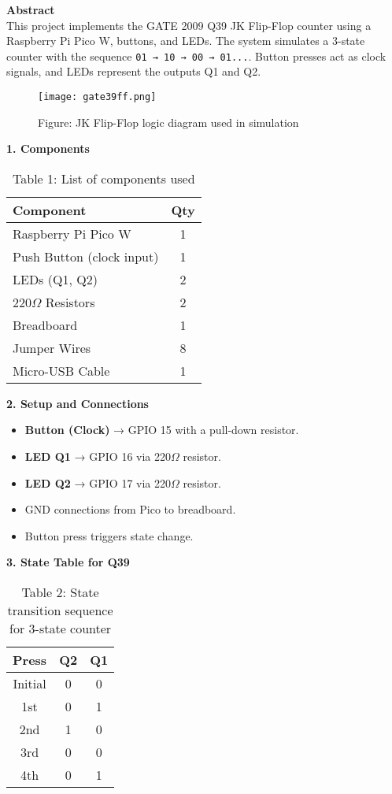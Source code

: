 \documentclass[12pt]{article}
\begin{document}
\begin{multicols}{2}

\noindent\textbf{Abstract} \\[0.5em]
This project implements the GATE 2009 Q39 JK Flip-Flop counter using a Raspberry Pi Pico W, buttons, and LEDs. The system simulates a 3-state counter with the sequence \texttt{01 → 10 → 00 → 01...}. Button presses act as clock signals, and LEDs represent the outputs Q1 and Q2.

\begin{figure}[H]
    \centering
    \texttt{[image: gate39ff.png]} %
    \caption*{Figure: JK Flip-Flop logic diagram used in simulation}
\end{figure}

\vspace{1em}
\noindent\textbf{1. Components}
\begin{table}[H]
\small
\centering
\begin{tabular}{|p{4.2cm}|c|}
\hline
\textbf{Component} & \textbf{Qty} \\
\hline
Raspberry Pi Pico W & 1 \\
Push Button (clock input) & 1 \\
LEDs (Q1, Q2) & 2 \\
220$\Omega$ Resistors & 2 \\
Breadboard & 1 \\
Jumper Wires & 8 \\
Micro-USB Cable & 1 \\
\hline
\end{tabular}
\caption*{Table 1: List of components used}
\end{table}

\vspace{1em}
\noindent\textbf{2. Setup and Connections}
\begin{itemize}
    \item \textbf{Button (Clock)} → GPIO 15 with a pull-down resistor.
    \item \textbf{LED Q1} → GPIO 16 via 220$\Omega$ resistor.
    \item \textbf{LED Q2} → GPIO 17 via 220$\Omega$ resistor.
    \item GND connections from Pico to breadboard.
    \item Button press triggers state change.
\end{itemize}

\vspace{1em}
\noindent\textbf{3. State Table for Q39}
\begin{table}[H]
\centering
\begin{tabular}{|c|c|c|}
\hline
\textbf{Press} & \textbf{Q2} & \textbf{Q1} \\
\hline
Initial & 0 & 0 \\
1st & 0 & 1 \\
2nd & 1 & 0 \\
3rd & 0 & 0 \\
4th & 0 & 1 \\
\hline
\end{tabular}
\caption*{Table 2: State transition sequence for 3-state counter}
\end{table}


\end{multicols}
\end{document}

